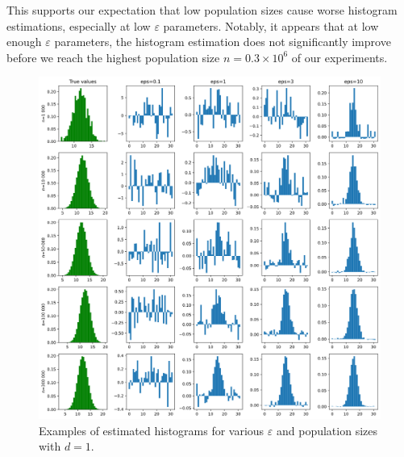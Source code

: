\documentclass[a4paper,12pt]{article}
\renewcommand{\epsilon}{\varepsilon}
\begin{document}
This supports our expectation that low population sizes cause worse histogram estimations, especially at low $\epsilon$ parameters. Notably, it appears that at low enough $\epsilon$ parameters, the histogram estimation does not significantly improve before we reach the highest population size $n=0.3 \times 10^6$ of our experiments.

\begin{figure}
    \centering
    \includegraphics[width=\textwidth]{imgs/histogram_matrix.png}
    \caption{Examples of estimated histograms for various $\epsilon$ and population sizes with $d=1$.}
    \label{fig:histogram_matrix}
\end{figure}
\end{document}
